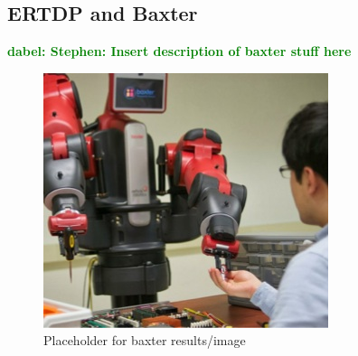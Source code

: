 \documentclass[letterpaper]{article}
\newcommand{\dnote}[1]{\textcolor{Green}{\textbf{dabel:  #1}}}
\begin{document}
\subsection{ERTDP and Baxter}

\dnote{Stephen: Insert description of baxter stuff here}

\begin{figure}[H]
\centering
\includegraphics[scale=0.195]{figures/baxter_temp.jpg}%
  \caption{Placeholder for baxter results/image}
  \label{fig:baxter_results}
\end{figure}
\end{document}
